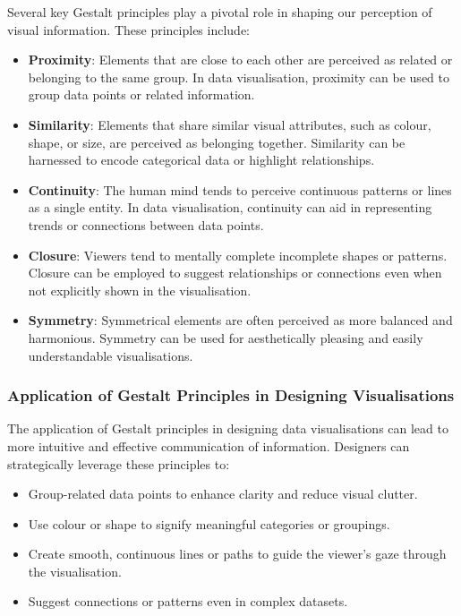 \documentclass{article}\usepackage[]{graphicx}\usepackage[]{xcolor}
\begin{document}
Several key Gestalt principles play a pivotal role in shaping our perception of visual information. These principles include: 
\begin{itemize}
    \item \textbf{Proximity}: Elements that are close to each other are perceived as related or belonging to the same group. In data visualisation, proximity can be used to group data points or related information.
    \item \textbf{Similarity}: Elements that share similar visual attributes, such as colour, shape, or size, are perceived as belonging together. Similarity can be harnessed to encode categorical data or highlight relationships. 
    \item \textbf{Continuity}: The human mind tends to perceive continuous patterns or lines as a single entity. In data visualisation, continuity can aid in representing trends or connections between data points.
    \item \textbf{Closure}: Viewers tend to mentally complete incomplete shapes or patterns. Closure can be employed to suggest relationships or connections even when not explicitly shown in the visualisation.
    \item \textbf{Symmetry}: Symmetrical elements are often perceived as more balanced and harmonious. Symmetry can be used for aesthetically pleasing and easily understandable visualisations.
\end{itemize}

\subsubsection{Application of Gestalt Principles in Designing Visualisations}
The application of Gestalt principles in designing data visualisations can lead to more intuitive and effective communication of information. Designers can strategically leverage these principles to:
\begin{itemize}
    \item Group-related data points to enhance clarity and reduce visual clutter.
    \item Use colour or shape to signify meaningful categories or groupings.
    \item Create smooth, continuous lines or paths to guide the viewer's gaze through the visualisation.
    \item Suggest connections or patterns even in complex datasets.
\end{itemize}
\end{document}

